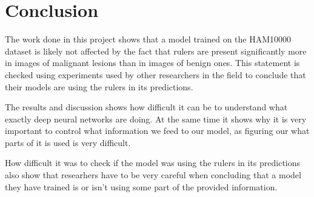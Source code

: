 \chapter{Conclusion}
The work done in this project shows that a model trained on the HAM10000 
dataset is likely not affected by the fact that rulers are present significantly
more in images of malignant lesions than in images of benign ones.
This statement is checked using experiments used by other researchers in the field
to conclude that their models are using the rulers in its predictions.

The results and discussion shows how difficult it can be to understand what
exactly deep neural networks are doing.
At the same time it shows why it is very important to control what information we feed
to our model, as figuring our what parts of it is used is very difficult.

How difficult it was to check if the model was using the rulers in its predictions
also show that researhers have to be very careful when concluding that a model
they have trained is or isn't using some part of the provided information.
